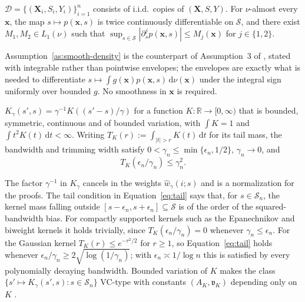 \begin{assumption}
\label{as:smooth-density}
$\mathcal{D}=\{(\mathbf{X}_i,S_i,Y_i)\}_{i=1}^n$ consists of i.i.d.\ copies of $(\mathbf{X},S,Y)$.  For $\nu$-almost every $\mathbf{x}$, the map $s\mapsto p(\mathbf{x},s)$ is twice continuously differentiable on $\mathcal{S}$, and there exist $M_1,M_2\in L_1(\nu)$ such that $\sup_{s\in\mathcal{S}}|\partial_s^{j}p(\mathbf{x},s)|\le M_j(\mathbf{x})$ for $j\in\{1,2\}$.
\end{assumption}

Assumption~\ref{as:smooth-density} is the counterpart of Assumption~3 of \citet{kong2025fair}, stated with integrable rather than pointwise envelopes; the envelopes are exactly what is needed to differentiate $s\mapsto\int g(\mathbf{x})p(\mathbf{x},s)\,\mathrm{d}\nu(\mathbf{x})$ under the integral sign uniformly over bounded $g$.  No smoothness in $\mathbf{x}$ is required.

\begin{assumption}
\label{as:kernel}
$K_{\gamma}(s',s)=\gamma^{-1}K((s'-s)/\gamma)$ for a function $K:\mathbb{R}\to[0,\infty)$ that is bounded, symmetric, continuous and of bounded variation, with $\int K=1$ and $\int t^2K(t)\,\mathrm{d}t<\infty$.  Writing $T_K(r):=\int_{|t|>r}K(t)\,\mathrm{d}t$ for its tail mass, the bandwidth and trimming width satisfy $0<\gamma_n\le\min\{\epsilon_n,1/2\}$, $\gamma_n\to0$, and
\begin{equation}
  T_K(\epsilon_n/\gamma_n)\le\gamma_n^2 .
  \label{eq:tail}
\end{equation}
\end{assumption}

The factor $\gamma^{-1}$ in $K_{\gamma}$ cancels in the weights $\widehat{w}_{\gamma}(i;s)$ and is a normalization for the proofs.  The tail condition in Equation~\ref{eq:tail} says that, for $s\in\mathcal{S}_n$, the kernel mass falling outside $[s-\epsilon_n,s+\epsilon_n]\subseteq\mathcal{S}$ is of the order of the squared-bandwidth bias.  For compactly supported kernels such as the Epanechnikov and biweight kernels it holds trivially, since $T_K(\epsilon_n/\gamma_n)=0$ whenever $\gamma_n\le\epsilon_n$.  For the Gaussian kernel $T_K(r)\le e^{-r^2/2}$ for $r\ge1$, so Equation~\ref{eq:tail} holds whenever $\epsilon_n/\gamma_n\ge2\sqrt{\log(1/\gamma_n)}$; with $\epsilon_n\asymp1/\log n$ this is satisfied by every polynomially decaying bandwidth.  Bounded variation of $K$ makes the class $\{s'\mapsto K_{\gamma}(s',s):s\in\mathcal{S}_n\}$ VC-type with constants $(A_K,\mathfrak{v}_K)$ depending only on $K$ \citep[Lemma~22]{nolan1987u}.

